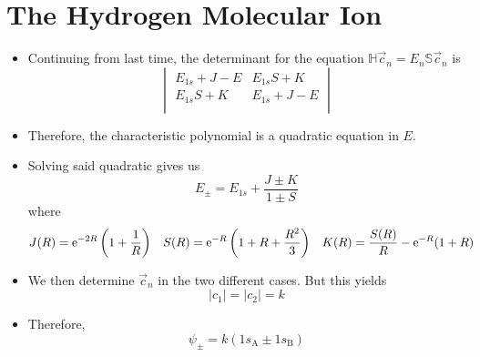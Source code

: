 \documentclass[../notes.tex]{subfiles}
\begin{document}
\section{The Hydrogen Molecular Ion}
\begin{itemize}
    \item {}Continuing from last time, the determinant for the equation $\mathbb{H}\vec{c}_n=E_n\mathbb{S}\vec{c}_n$ is
    \begin{equation*}
        \begin{vmatrix}
            E_{1s}+J-E & E_{1s}S+K\\
            E_{1s}S+K & E_{1s}+J-E\\
        \end{vmatrix}
    \end{equation*}
    \item Therefore, the characteristic polynomial is a quadratic equation in $E$.
    \item Solving said quadratic gives us
    \begin{equation*}
        E_\pm = E_{1s}+\frac{J\pm K}{1\pm S}
    \end{equation*}
    where
    \begin{align*}
        J(R) &= \e[-2R]\left( 1+\frac{1}{R} \right)&
        S(R) &= \e[-R]\left( 1+R+\frac{R^2}{3} \right)&
        K(R) &= \frac{S(R)}{R}-\e[-R](1+R)
    \end{align*}
    \item We then determine $\vec{c}_n$ in the two different cases. But this yields
    \begin{equation*}
        |c_1| = |c_2| = k
    \end{equation*}
    \item Therefore,
    \begin{equation*}
        \psi_\pm = k(1s_\text{A}\pm 1s_\text{B})
    \end{equation*}
    \begin{figure}[H]
        \centering
        \footnotesize
        \begin{subfigure}[b]{0.4\linewidth}
            \centering
\end{subfigure}
\end{figure}
\end{itemize}
\end{document}
